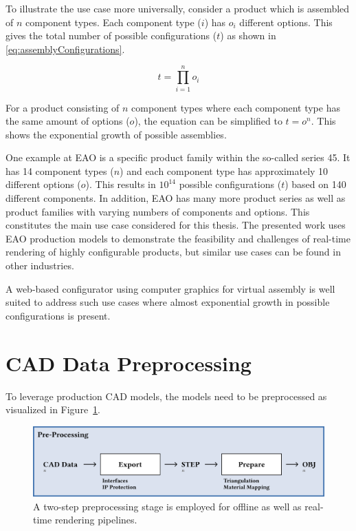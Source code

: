 To illustrate the use case more universally, consider a product which is assembled of $n$ component types. Each component type ($i$) has $o_i$ different options. This gives the total number of possible configurations ($t$) as shown in \autoref{eq:assemblyConfigurations}.

\begin{equation}
  t = \prod_{i=1}^n o_i
  \label{eq:assemblyConfigurations}
\end{equation}

For a product consisting of $n$ component types where each component type has the same amount of options ($o$), the equation can be simplified to $t = o^n$. This shows the exponential growth of possible assemblies.

One example at EAO is a specific product family within the so-called series 45. It has 14 component types ($n$) and each component type has approximately 10 different options ($o$). This results in $10^{14}$ possible configurations ($t$) based on 140 different components. In addition, EAO has many more product series as well as product families with varying numbers of components and options. This constitutes the main use case considered for this thesis. The presented work uses EAO production models to demonstrate the feasibility and challenges of real-time rendering of highly configurable products, but similar use cases can be found in other industries.

A web-based configurator using computer graphics for virtual assembly is well suited to address such use cases where almost exponential growth in possible configurations is present.

\section{CAD Data Preprocessing}

To leverage production \gls{CAD} models, the models need to be preprocessed as visualized in Figure~\ref{fig:cad-preprocessing}.

\begin{figure}[H]
  \centering
  \includegraphics[width=0.9\columnwidth]{resources/cad-pipeline-preprocessing.png}
  \caption{A two-step preprocessing stage is employed for offline as well as real-time rendering pipelines.}
  \label{fig:cad-preprocessing}
\end{figure}

